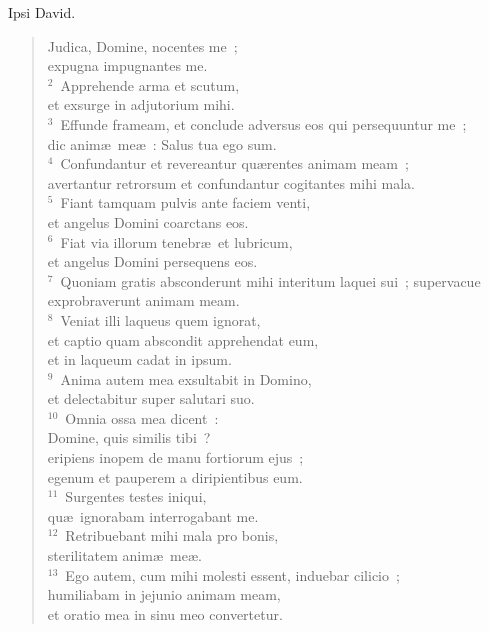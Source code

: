 \lettrine[lines=3,image=true,loversize=0.05,lraise=-0.03]{I}{}psi David. \begin{flushleft}\begin{verse}\vspace{6pt}Judica, Domine, nocentes me~;\\ expugna impugnantes me.\\
${}^{2}$~Apprehende arma et scutum,\\ et exsurge in adjutorium mihi.\\
${}^{3}$~Effunde frameam, et conclude adversus eos qui persequuntur me~;\\ dic anim\ae\ me\ae~: Salus tua ego sum.\\
${}^{4}$~Confundantur et revereantur qu\ae rentes animam meam~;\\ avertantur retrorsum et confundantur cogitantes mihi mala.\\
${}^{5}$~Fiant tamquam pulvis ante faciem venti,\\ et angelus Domini coarctans eos.\\
${}^{6}$~Fiat via illorum tenebr\ae\ et lubricum,\\ et angelus Domini persequens eos.\\
${}^{7}$~Quoniam gratis absconderunt mihi interitum laquei sui~; supervacue exprobraverunt animam meam.\\
${}^{8}$~Veniat illi laqueus quem ignorat,\\ et captio quam abscondit apprehendat eum,\\ et in laqueum cadat in ipsum.\\
${}^{9}$~Anima autem mea exsultabit in Domino,\\ et delectabitur super salutari suo.\\
${}^{10}$~Omnia ossa mea dicent~:\\ Domine, quis similis tibi~?\\ eripiens inopem de manu fortiorum ejus~;\\ egenum et pauperem a diripientibus eum.\\
${}^{11}$~Surgentes testes iniqui,\\ qu\ae\ ignorabam interrogabant me.\\
${}^{12}$~Retribuebant mihi mala pro bonis,\\ sterilitatem anim\ae\ me\ae .\\
${}^{13}$~Ego autem, cum mihi molesti essent, induebar cilicio~;\\ humiliabam in jejunio animam meam,\\ et oratio mea in sinu meo convertetur.\\

\end{verse}
\end{flushleft}
